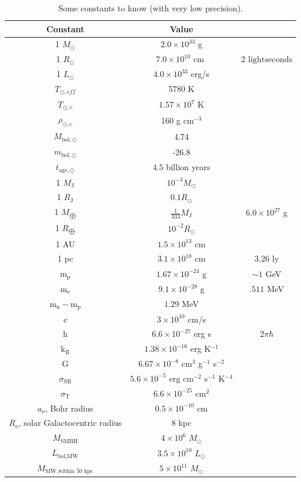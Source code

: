 \begin{table}[h!]
\centering
\begin{tabular}{c c c}
\hline\hline
Constant&Value\\ \hline
1 $M_{\odot}$	&	$2.0 \times 10^{33}$ g\\
1 $R_{\odot}$	&	$7.0 \times 10^{10} \text{ cm }$	&	$ 2 \text{ lightseconds}$ \\
1 $L_{\odot}$	&	$4.0 \times 10^{33}$ erg/s \\
$T_{\odot,eff}$	&	5780 K \\
$T_{\odot,c}$	&	$1.57 \times 10^7$ K \\
$\rho_{\odot,c}$	&	160 g cm$^{-3}$ \\
$M_{\text{bol},\odot}$	&	4.74 \\
$m_{\text{bol},\odot}$	&	-26.8 \\
$t_{\text{age},\odot}$	&	$4.5$ billion years \\	 \hline
1 $M_{\text{J}}$	&	$10^{-3} M_{\odot}$ \\
1 $R_{\text{J}}$		&	$0.1 R_{\odot}$ \\
1 $M_{\bigoplus}$	&	$\frac{1}{333} M_{\text{J}}$	& $6.0 \times 10^{27}$ g \\
1 $R_{\bigoplus}$	&	$10^{-2} R_{\odot}$ \\ \hline
1 AU		&	$1.5 \times 10^{13}$ cm	\\
1 pc		&	$3.1 \times 10^{18}$ cm	&	3.26 ly \\ \hline
m$_{\text{p}}$		&	$1.67 \times 10^{-24}$ g	&	$\sim 1$ GeV \\
m$_{\text{e}}$		&	$9.1 \times 10^{-28}$ g 	&	$.511$ MeV\\
m$_{\text{n}} - $m$_{\text{p}}$		&	$1.29$ MeV \\
c		&	$3 \times 10^{10}$ cm/s \\
h		&	$6.6 \times 10^{-27}$ erg s	&	$2 \pi \hbar$ \\
k$_{\text{B}}$	&	$1.38 \times 10^{-16}$ erg K$^{-1}$ \\
G	&	$6.67 \times 10^{-8}$ cm$^3$ g$^{-1}$ s$^{-2}$ \\
$\sigma_{\text{SB}}$	&	$5.6 \times 10^{-5}$ erg cm$^{-2}$ s$^{-1}$ K$^{-4}$ \\
$\sigma_{\text{T}}$	&	$6.6 \times 10^{-25}$ cm$^2$ \\
$a_{o}$, Bohr radius	&	$0.5 \times 10^{-10}$ cm \\ \hline \hline
$R_{o}$, solar Galactocentric radius		&	$8$ kpc \\
$M_{\text{SMBH}}$	&	$4 \times 10^6$ $M_{\odot}$ \\
$L_{\text{bol,MW}}$	&	$3.5 \times 10^{10}$ $L_{\odot}$ \\
$M_{\text{MW,within 50 kpc}}$	&	$5 \times 10^{11}$ $M_{\odot}$ \\

\hline\hline
\end{tabular}
\caption{Some constants to know (with very low precision).}
\label{tab:constants}
\end{table}
\pagebreak

